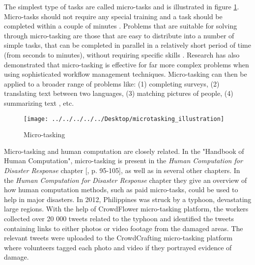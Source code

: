 The simplest type of tasks are called micro-tasks and is illustrated in figure \ref{fig:microtaskingillustration}. Micro-tasks should not require any special training and a task should be completed within a couple of minutes \citep{Ipeirotis2010}. Problems that are suitable for solving through micro-tasking are those that are easy to distribute into a number of simple tasks, that can be completed in parallel in a relatively short period of time (from seconds to minutes), without requiring specific skills \citep{Sarasua2012}. Research has also demonstrated that micro-tasking is effective for far more complex problems when using sophisticated workflow management techniques. Micro-tasking can then be applied to a broader range of problems like: (1) completing surveys, (2) translating text between two languages, (3) matching pictures of people, (4) summarizing text \citep{Bernstein2015a}, etc. 

\begin{figure}[H]
	\centering
	\texttt{[image: ../../../../../Desktop/microtasking\_illustration]}
	\caption{Micro-tasking \citep{Michelucci2015}}
	\label{fig:microtaskingillustration}
\end{figure}

Micro-tasking and human computation are closely related. In the "Handbook of Human Computation", micro-tasking is present in the \textit{Human Computation for Disaster Response} chapter [\citep{Meier2013}, p. 95-105], as well as in several other chapters. In the \textit{Human Computation for Disaster Response} chapter they give an overview of how human computation methods, such as paid micro-tasks, could be used to help in major disasters. In 2012, Philippines was struck by a typhoon, devastating large regions. With the help of CrowdFlower micro-tasking platform, the workers collected over 20 000 tweets related to the typhoon and identified the tweets containing links to either photos or video footage from the damaged areas. The relevant tweets were uploaded to the CrowdCrafting micro-tasking platform where volunteers tagged each photo and video if they portrayed evidence of damage. 
  
